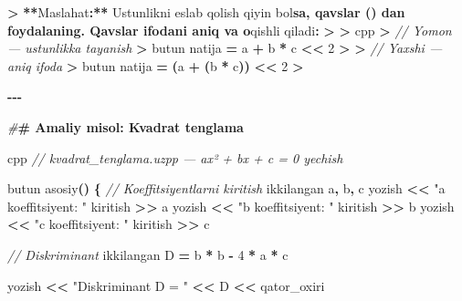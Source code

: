\documentclass[a4paper,11pt,twoside,openright]{book}
\newenvironment{Shaded}{\begin{snugshade}}{\end{snugshade}}
\newcommand{\CharTok}[1]{\textcolor[rgb]{0.31,0.60,0.02}{#1}}
\newcommand{\CommentTok}[1]{\textcolor[rgb]{0.56,0.35,0.01}{\textit{#1}}}
\newcommand{\DecValTok}[1]{\textcolor[rgb]{0.00,0.00,0.81}{#1}}
\newcommand{\ErrorTok}[1]{\textcolor[rgb]{0.64,0.00,0.00}{\textbf{#1}}}
\newcommand{\NormalTok}[1]{#1}
\newcommand{\OperatorTok}[1]{\textcolor[rgb]{0.81,0.36,0.00}{\textbf{#1}}}
\newcommand{\PreprocessorTok}[1]{\textcolor[rgb]{0.56,0.35,0.01}{\textit{#1}}}
\newcommand{\StringTok}[1]{\textcolor[rgb]{0.31,0.60,0.02}{#1}}
\begin{document}
\begin{Shaded}
\begin{Highlighting}[]
\OperatorTok{\textgreater{}} \OperatorTok{**}\NormalTok{Maslahat}\OperatorTok{:**}\NormalTok{ Ustunlikni eslab qolish qiyin bo}\CharTok{\textquotesingle{}l}\ErrorTok{sa, qavslar \textasciigrave{}()\textasciigrave{} dan foydalaning. Qavslar ifodani aniq va o}\CharTok{\textquotesingle{}}\NormalTok{qishli qiladi}\OperatorTok{:}
\OperatorTok{\textgreater{}}
\OperatorTok{\textgreater{}} \ErrorTok{\textasciigrave{}\textasciigrave{}\textasciigrave{}}\NormalTok{cpp}
\OperatorTok{\textgreater{}} \CommentTok{// Yomon — ustunlikka tayanish}
\OperatorTok{\textgreater{}}\NormalTok{ butun natija }\OperatorTok{=}\NormalTok{ a }\OperatorTok{+}\NormalTok{ b }\OperatorTok{*}\NormalTok{ c }\OperatorTok{\textless{}\textless{}} \DecValTok{2}
\OperatorTok{\textgreater{}} 
\OperatorTok{\textgreater{}} \CommentTok{// Yaxshi — aniq ifoda}
\OperatorTok{\textgreater{}}\NormalTok{ butun natija }\OperatorTok{=} \OperatorTok{(}\NormalTok{a }\OperatorTok{+} \OperatorTok{(}\NormalTok{b }\OperatorTok{*}\NormalTok{ c}\OperatorTok{))} \OperatorTok{\textless{}\textless{}} \DecValTok{2}
\OperatorTok{\textgreater{}} \ErrorTok{\textasciigrave{}\textasciigrave{}\textasciigrave{}}

\OperatorTok{{-}{-}{-}}

\PreprocessorTok{\#}\ErrorTok{\# Amaliy misol: Kvadrat tenglama}

\ErrorTok{\textasciigrave{}\textasciigrave{}\textasciigrave{}}\NormalTok{cpp}
\CommentTok{// kvadrat\_tenglama.uzpp — ax² + bx + c = 0 yechish}

\NormalTok{butun asosiy}\OperatorTok{()} \OperatorTok{\{}
    \CommentTok{// Koeffitsiyentlarni kiritish}
\NormalTok{    ikkilangan a}\OperatorTok{,}\NormalTok{ b}\OperatorTok{,}\NormalTok{ c}
\NormalTok{    yozish }\OperatorTok{\textless{}\textless{}} \StringTok{"a koeffitsiyent: "}
\NormalTok{    kiritish }\OperatorTok{\textgreater{}\textgreater{}}\NormalTok{ a}
\NormalTok{    yozish }\OperatorTok{\textless{}\textless{}} \StringTok{"b koeffitsiyent: "}
\NormalTok{    kiritish }\OperatorTok{\textgreater{}\textgreater{}}\NormalTok{ b}
\NormalTok{    yozish }\OperatorTok{\textless{}\textless{}} \StringTok{"c koeffitsiyent: "}
\NormalTok{    kiritish }\OperatorTok{\textgreater{}\textgreater{}}\NormalTok{ c}

    \CommentTok{// Diskriminant}
\NormalTok{    ikkilangan D }\OperatorTok{=}\NormalTok{ b }\OperatorTok{*}\NormalTok{ b }\OperatorTok{{-}} \DecValTok{4} \OperatorTok{*}\NormalTok{ a }\OperatorTok{*}\NormalTok{ c}

\NormalTok{    yozish }\OperatorTok{\textless{}\textless{}} \StringTok{"Diskriminant D = "} \OperatorTok{\textless{}\textless{}}\NormalTok{ D }\OperatorTok{\textless{}\textless{}}\NormalTok{ qator\_oxiri}


\end{Highlighting}
\end{Shaded}
\end{document}
